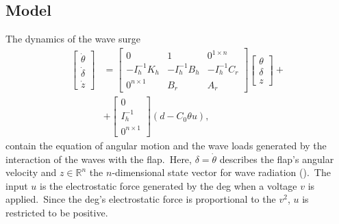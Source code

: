 \subsection{Model}
The dynamics of the wave surge 
\begin{equation}\label{eq:dynamics}
	\begin{split}
		\begin{bmatrix}
			\dot{\theta} \\
			\dot{\delta}  \\
			\dot{z}
		\end{bmatrix}
		& = \begin{bmatrix}
			0 & 1 & 0^{1\times n} \\
			-I_h^{-1}K_h & -I_h^{-1}B_h & -I_h^{-1}C_r \\[3pt]
			0^{n\times 1} & B_r & A_r
		\end{bmatrix}    \begin{bmatrix}
			{\theta} \\
			{\delta}  \\
			{z}
		\end{bmatrix} +  \\ &  + \begin{bmatrix}
			0 \\
			I_h^{-1}  \\
			0^{n\times 1}
		\end{bmatrix} \left(d -C_0\theta u \right),
	\end{split}
\end{equation}
contain the equation of angular motion and the wave loads generated by the interaction of the waves with the flap.\ 
Here, $\delta = \dot{\theta}$ describes the flap's angular velocity and $z \in \mathbb{R}^n$ the $n$-dimensional state vector for wave radiation (\cite{Yu1995}).\
The input $u$ is the electrostatic force generated by the \ac{deg} when a voltage $v$ is applied.\ 
Since the \ac{deg}'s electrostatic force is proportional to the $v^2$, $u$ is restricted to be positive.

